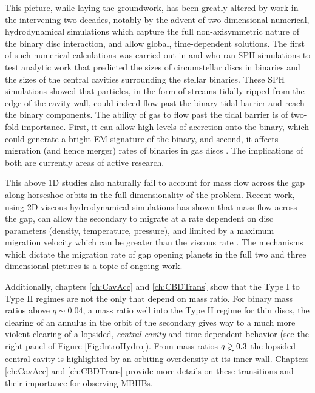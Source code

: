 This picture, while laying the groundwork, has been greatly altered by work in
the intervening two decades, notably by the advent of two-dimensional
numerical, hydrodynamical simulations which capture the full non-axisymmetric
nature of the binary disc interaction, and allow global, time-dependent
solutions. The first of such numerical calculations was carried out in
\cite{AL94} and \cite{ArtyLubow:1996} who ran SPH simulations to test analytic
work that predicted the sizes of circumstellar discs in binaries and the sizes
of the central cavities surrounding the stellar binaries. These SPH
simulations showed that particles, in the form of streams tidally ripped from
the edge of the cavity wall, could indeed flow past the binary tidal barrier
and reach the binary components. The ability of gas to flow past the tidal
barrier is of two-fold importance. First, it can allow high levels of
accretion onto the binary, which could generate a bright EM signature of the
binary, and second, it affects migration (and hence merger) rates of binaries
in gas discs \citep[\textit{e.g.}][]{Kocsis+2012a, Kocsis+2012b, Rafikov:2013,
Rafikov:2016}. The implications of both are currently areas of active
research.




This above 1D studies also naturally fail to account for mass flow across the
gap along horseshoe orbits in the full dimensionality of the problem. Recent
work, using 2D viscous hydrodynamical simulations has shown that mass flow
across the gap, can allow the secondary to migrate at a rate dependent on disc
parameters (density, temperature, pressure), and limited by a maximum migration
velocity which can be greater than the viscous rate \citep{Edgar:2008,
DuffellFTV:2014, DurmannKley:2015}. The mechanisms which dictate the migration
rate of gap opening planets in the full two and three dimensional pictures is
a topic of ongoing work.



Additionally, chapters \ref{ch:CavAcc} \citep{DHM:2013:MNRAS} and \ref{ch:CBDTrans}
\citep{D'Orazio:CBDTrans:2016} show that the Type I to Type II regimes are not
the only that depend on mass ratio. For binary mass ratios above $q\sim0.04$,
a mass ratio well into the Type II regime for thin discs, the clearing of an
annulus in the orbit of the secondary gives way to a much more violent
clearing of a lopsided, \textit{central cavity} and time dependent behavior (see the right panel of Figure \ref{Fig:IntroHydro}).
From mass ratios $q \gsim 0.3$ the lopsided central cavity is highlighted by an
orbiting overdensity at its inner wall. Chapters \ref{ch:CavAcc} and
\ref{ch:CBDTrans} provide more details on these transitions and their
importance for observing MBHBs.




